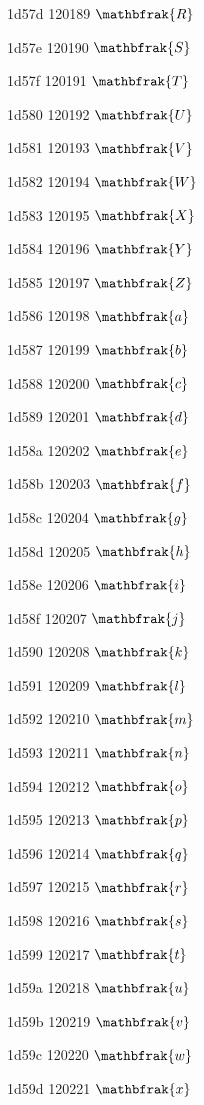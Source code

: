 \documentclass[11pt]{article}
\begin{document}
1d57d 120189 \ensuremath{\mathbfrak{R}}

1d57e 120190 \ensuremath{\mathbfrak{S}}

1d57f 120191 \ensuremath{\mathbfrak{T}}

1d580 120192 \ensuremath{\mathbfrak{U}}

1d581 120193 \ensuremath{\mathbfrak{V}}

1d582 120194 \ensuremath{\mathbfrak{W}}

1d583 120195 \ensuremath{\mathbfrak{X}}

1d584 120196 \ensuremath{\mathbfrak{Y}}

1d585 120197 \ensuremath{\mathbfrak{Z}}

1d586 120198 \ensuremath{\mathbfrak{a}}

1d587 120199 \ensuremath{\mathbfrak{b}}

1d588 120200 \ensuremath{\mathbfrak{c}}

1d589 120201 \ensuremath{\mathbfrak{d}}

1d58a 120202 \ensuremath{\mathbfrak{e}}

1d58b 120203 \ensuremath{\mathbfrak{f}}

1d58c 120204 \ensuremath{\mathbfrak{g}}

1d58d 120205 \ensuremath{\mathbfrak{h}}

1d58e 120206 \ensuremath{\mathbfrak{i}}

1d58f 120207 \ensuremath{\mathbfrak{j}}

1d590 120208 \ensuremath{\mathbfrak{k}}

1d591 120209 \ensuremath{\mathbfrak{l}}

1d592 120210 \ensuremath{\mathbfrak{m}}

1d593 120211 \ensuremath{\mathbfrak{n}}

1d594 120212 \ensuremath{\mathbfrak{o}}

1d595 120213 \ensuremath{\mathbfrak{p}}

1d596 120214 \ensuremath{\mathbfrak{q}}

1d597 120215 \ensuremath{\mathbfrak{r}}

1d598 120216 \ensuremath{\mathbfrak{s}}

1d599 120217 \ensuremath{\mathbfrak{t}}

1d59a 120218 \ensuremath{\mathbfrak{u}}

1d59b 120219 \ensuremath{\mathbfrak{v}}

1d59c 120220 \ensuremath{\mathbfrak{w}}

1d59d 120221 \ensuremath{\mathbfrak{x}}
\end{document}
